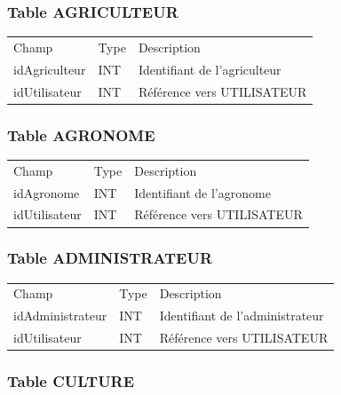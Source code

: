 \documentclass[
]{article}
\begin{document}
\hypertarget{table-agriculteur}{%
\subsubsection{Table AGRICULTEUR}\label{table-agriculteur}}

\begin{longtable}[]{@{}lll@{}}
\toprule
\endhead
Champ & Type & Description \\
idAgriculteur & INT & Identifiant de l'agriculteur \\
idUtilisateur & INT & Référence vers UTILISATEUR \\
\bottomrule
\end{longtable}

\hypertarget{table-agronome}{%
\subsubsection{Table AGRONOME}\label{table-agronome}}

\begin{longtable}[]{@{}lll@{}}
\toprule
\endhead
Champ & Type & Description \\
idAgronome & INT & Identifiant de l'agronome \\
idUtilisateur & INT & Référence vers UTILISATEUR \\
\bottomrule
\end{longtable}

\hypertarget{table-administrateur}{%
\subsubsection{Table ADMINISTRATEUR}\label{table-administrateur}}

\begin{longtable}[]{@{}lll@{}}
\toprule
\endhead
Champ & Type & Description \\
idAdministrateur & INT & Identifiant de l'administrateur \\
idUtilisateur & INT & Référence vers UTILISATEUR \\
\bottomrule
\end{longtable}

\hypertarget{table-culture}{%
\subsubsection{Table CULTURE}\label{table-culture}}
\end{document}
